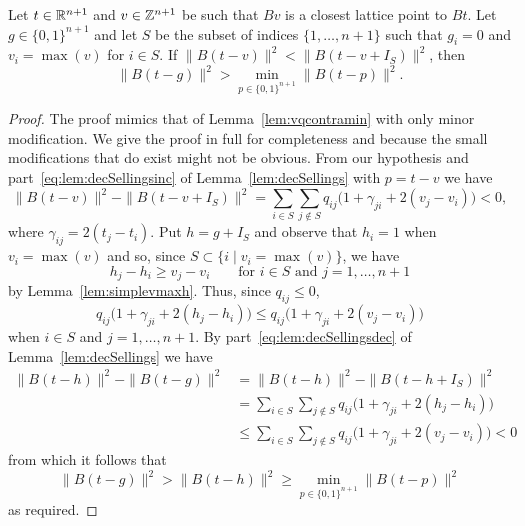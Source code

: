 \documentclass[final,leqno]{siamltex}
\begin{document}
\begin{lemma}\label{lem:vqcontramax}
Let $t \in {\mathbb R}^{n+1}$ and $v \in {\mathbb Z}^{n+1}$ be such that $Bv$ is a closest lattice point to $Bt$.  Let $g \in \{0,1\}^{n+1}$ and let $S$ be the subset of indices $\{1,\dots,n+1\}$ such that $g_i=0$ and $v_i = \max(v)$ for $i \in S$.  If $\|B(t-v)\|^2 < \|B(t-v+I_S)\|^2$, then
\[
\|B(t - g)\|^2 > \min_{p \in \{0,1\}^{n+1}}\|B(t - p)\|^2.
\]
\end{lemma}
\begin{proof}
The proof mimics that of Lemma~\ref{lem:vqcontramin} with only minor modification.  We give the proof in full for completeness and because the small modifications that do exist might not be obvious. From our hypothesis and part~\ref{eq:lem:decSellingsinc} of Lemma~\ref{lem:decSellings} with $p = t-v$ we have
\[
\|B(t-v)\|^2 - \|B(t-v+I_S)\|^2 = \sum_{i \in S}\sum_{j \notin S}q_{ij}\big(1 + \gamma_{ji} + 2(v_j - v_i)\big) < 0,
\]
where $\gamma_{ij} = 2(t_j - t_i)$.  Put $h = g + I_S$ and observe that $h_i = 1$ when $v_i = \max(v)$ and so, since $S \subset \{i \mid v_i = \max(v) \}$, we have
\[
h_j - h_i \geq v_j - v_i \qquad \text{for $i \in S$ and $j=1,\dots,n+1$}
\]
by Lemma~\ref{lem:simplevmaxh}.  Thus, since $q_{ij} \leq 0$,
\[
q_{ij}\big(1 + \gamma_{ji} + 2(h_j - h_i)\big) \leq q_{ij}\big(1 + \gamma_{ji} + 2(v_j - v_i)\big)
\]
when $i \in S$ and $j =1,\dots,n+1$.  By part~\ref{eq:lem:decSellingsdec} of Lemma~\ref{lem:decSellings} we have
\begin{align*}
\|B(t-h)\|^2 - \|B(t-g)\|^2 &= \|B(t-h)\|^2 - \|B(t-h+I_S)\|^2 \\
&= \sum_{i \in S}\sum_{j \notin S}q_{ij}\big(1 + \gamma_{ji} + 2(h_j - h_i)\big) \\
&\leq \sum_{i \in S}\sum_{j \notin S}q_{ij}\big(1 + \gamma_{ji} + 2(v_j - v_i)\big) < 0
\end{align*}
from which it follows that
\[
\|B(t-g)\|^2 > \|B(t-h)\|^2 \geq \min_{p \in \{0,1\}^{n+1}}\|B(t  - p)\|^2
\]
as required.
\end{proof}

\end{document}
